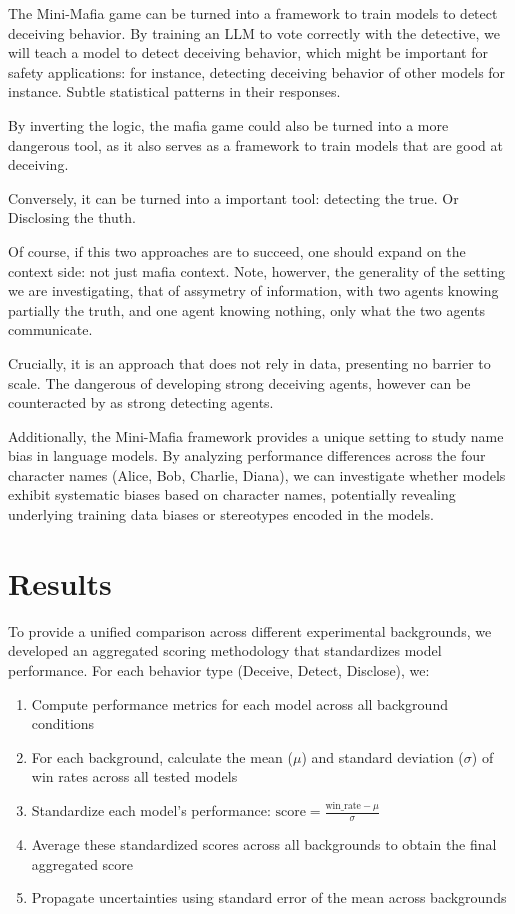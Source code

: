 \documentclass{article}
\begin{document}
The Mini-Mafia game can be turned into a framework to train models to detect deceiving behavior. By training an LLM to vote correctly with the detective, we will teach a model to detect deceiving behavior, which might be important for safety applications: for instance, detecting deceiving behavior of other models for instance. Subtle statistical patterns in their responses.

By inverting the logic, the mafia game could also be turned into a more dangerous tool, as it also serves as a framework to train models that are good at deceiving.

Conversely, it can be turned into a important tool: detecting the true. Or Disclosing the thuth.

Of course, if this two approaches are to succeed, one should expand on the context side: not just mafia context. Note, howerver, the generality of the setting we are investigating, that of assymetry of information, with two agents knowing partially the truth, and one agent knowing nothing, only what the two agents communicate.

Crucially, it is an approach that does not rely in data, presenting no barrier to scale. The dangerous of developing strong deceiving agents, however can be counteracted by as strong detecting agents.

Additionally, the Mini-Mafia framework provides a unique setting to study name bias in language models. By analyzing performance differences across the four character names (Alice, Bob, Charlie, Diana), we can investigate whether models exhibit systematic biases based on character names, potentially revealing underlying training data biases or stereotypes encoded in the models.



\section{Results}

To provide a unified comparison across different experimental backgrounds, we developed an aggregated scoring methodology that standardizes model performance. For each behavior type (Deceive, Detect, Disclose), we:

\begin{enumerate}
    \item Compute performance metrics for each model across all background conditions
    \item For each background, calculate the mean ($\mu$) and standard deviation ($\sigma$) of win rates across all tested models
    \item Standardize each model's performance: $\text{score} = \frac{\text{win\_rate} - \mu}{\sigma}$
    \item Average these standardized scores across all backgrounds to obtain the final aggregated score
    \item Propagate uncertainties using standard error of the mean across backgrounds
\end{enumerate}
\end{document}
